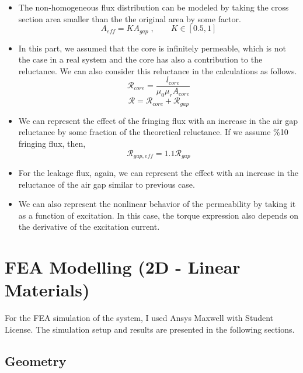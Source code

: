 \documentclass[11pt]{report}
\begin{document}
\begin{itemize}
    \item The non-homogeneous flux distribution can be modeled by taking the cross section area smaller than the the original area by some factor.
    \begin{equation}
        A_{eff} = KA_{gap}\;, \qquad K\in [0.5,1]
    \end{equation}
    \item In this part, we assumed that the core is infinitely permeable, which is not the case in a real system and the core has also a contribution to the reluctance. We can also consider this reluctance in the calculations as follows.
    \begin{equation}
        \mathcal{R}_{core} = \frac{l_{core}}{\mu_0\mu_rA_{core}}
    \end{equation}
    \begin{equation}
        \mathcal{R}=\mathcal{R}_{core}+\mathcal{R}_{gap}
    \end{equation}
    \item We can represent the effect of the fringing flux with an increase in the air gap reluctance by some fraction of the theoretical reluctance. If we assume \%10 fringing flux, then,
    \begin{equation}
        \mathcal{R}_{gap,eff}=1.1\mathcal{R}_{gap}
    \end{equation}
    \item For the leakage flux, again, we can represent the effect with an increase in the reluctance of the air gap similar to previous case.
    \item We can also represent the nonlinear behavior of the permeability by taking it as a function of excitation. In this case, the torque expression also depends on the derivative of the excitation current. 
\end{itemize}

\newpage


\section*{FEA Modelling (2D - Linear Materials)}
For the FEA simulation of the system, I used Ansys Maxwell with Student License. The simulation setup and results are presented in the following sections.

\subsection*{Geometry}
\end{document}
